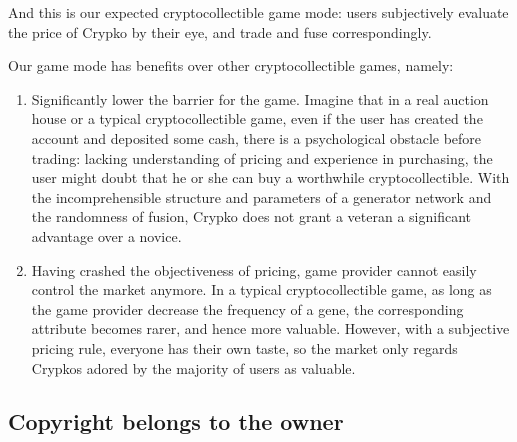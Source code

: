 \documentclass[a4paper]{article}
\begin{document}
And this is our expected cryptocollectible game mode: users subjectively evaluate the price of Crypko by their eye, and trade and fuse correspondingly.

Our game mode has benefits over other cryptocollectible games, namely:

\begin{enumerate}
    \item Significantly lower the barrier for the game. Imagine that in a real auction house or a typical cryptocollectible game, even if the user has created the account and deposited some cash, there is a psychological obstacle before trading: lacking understanding of pricing and experience in purchasing, the user might doubt that he or she can buy a worthwhile cryptocollectible. With the incomprehensible structure and parameters of a generator network and the randomness of fusion, Crypko does not grant a veteran a significant advantage over a novice.
    \item Having crashed the objectiveness of pricing, game provider cannot easily control the market anymore. In a typical cryptocollectible game, as long as the game provider decrease the frequency of a gene, the corresponding attribute becomes rarer, and hence more valuable. However, with a subjective pricing rule, everyone has their own taste, so the market only regards Crypkos adored by the majority of users as valuable.

\end{enumerate}

\subsection{Copyright belongs to the owner}
\end{document}
